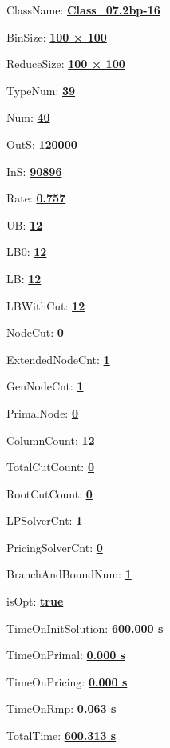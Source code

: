 \documentclass[11pt]{article}
\begin{document}
\pagestyle{empty}


ClassName: \underline{\textbf{Class_07.2bp-16}}
\par
BinSize: \underline{\textbf{100 × 100}}
\par
ReduceSize: \underline{\textbf{100 × 100}}
\par
TypeNum: \underline{\textbf{39}}
\par
Num: \underline{\textbf{40}}
\par
OutS: \underline{\textbf{120000}}
\par
InS: \underline{\textbf{90896}}
\par
Rate: \underline{\textbf{0.757}}
\par
UB: \underline{\textbf{12}}
\par
LB0: \underline{\textbf{12}}
\par
LB: \underline{\textbf{12}}
\par
LBWithCut: \underline{\textbf{12}}
\par
NodeCut: \underline{\textbf{0}}
\par
ExtendedNodeCnt: \underline{\textbf{1}}
\par
GenNodeCnt: \underline{\textbf{1}}
\par
PrimalNode: \underline{\textbf{0}}
\par
ColumnCount: \underline{\textbf{12}}
\par
TotalCutCount: \underline{\textbf{0}}
\par
RootCutCount: \underline{\textbf{0}}
\par
LPSolverCnt: \underline{\textbf{1}}
\par
PricingSolverCnt: \underline{\textbf{0}}
\par
BranchAndBoundNum: \underline{\textbf{1}}
\par
isOpt: \underline{\textbf{true}}
\par
TimeOnInitSolution: \underline{\textbf{600.000 s}}
\par
TimeOnPrimal: \underline{\textbf{0.000 s}}
\par
TimeOnPricing: \underline{\textbf{0.000 s}}
\par
TimeOnRmp: \underline{\textbf{0.063 s}}
\par
TotalTime: \underline{\textbf{600.313 s}}
\par
\newpage


\end{document}
